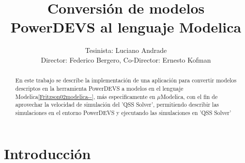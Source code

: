 \documentclass[a4paper,	11pt]{report}
\begin{document}
\renewcommand\floatpagefraction{.9}
\renewcommand\topfraction{.9}
\renewcommand\bottomfraction{.9}
\renewcommand\textfraction{.1}
\setcounter{totalnumber}{50}
\setcounter{topnumber}{50}
\setcounter{bottomnumber}{50}

\title{Conversión de modelos PowerDEVS al lenguaje Modelica}
\author{Tesinista: Luciano Andrade \\ Director: Federico Bergero, Co-Director: Ernesto Kofman} 

\maketitle
\tableofcontents

\begin{abstract}
En este trabajo se describe la implementación de una aplicación para convertir modelos descriptos en la herramienta PowerDEVS a modelos en el lenguaje Modelica\ref{Fritzson02modelica--}, más especificamente en $\mu$Modelica, con el fin de aprovechar la velocidad de simulación del 'QSS Solver', permitiendo describir las simulaciones en el entorno PowerDEVS y ejecutando las simulaciones en 'QSS Solver'
\end{abstract}


\chapter{Introducción}
\end{document}
